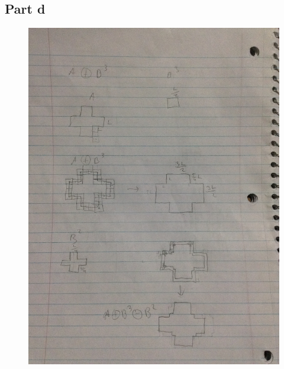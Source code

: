 \documentclass{article}
\begin{document}
	\subsection{Part d}
	\begin{figure}[H]
		\includegraphics[width=\linewidth]{9.6/fig4.JPG}
	\end{figure}
	
	\newpage
\end{document}
